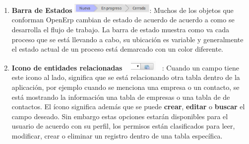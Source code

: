 \begin{enumerate}
 \item \textbf{Barra de Estados} \includegraphics[width=4cm,height=0.5cm]{./Imagenes/barraestados.png}:
  Muchos de los objetos que conforman OpenErp cambian de estado de acuerdo de acuerdo a como se desarrolla el
  flujo de trabajo. La barra de estado muestra como va cada proceso que se está llevando a cabo, su ubicación es variable
  y generalmente el estado actual de un proceso está demarcado con un color diferente.
 \item \textbf {Icono de entidades relacionadas} \includegraphics[width=2cm,height=0.5cm]{./Imagenes/entidadesrelacionadas.png}: Cuando un campo tiene este icono al lado,
 significa que se está relacionando otra tabla dentro de la aplicación, por ejemplo cuando se menciona una empresa o un contacto, se está mostrando la información una tabla
 de empresas o una tabla de de contactos. El ícono significa además que se puede  \textbf{crear}, \textbf{editar} o \textbf{buscar} el campo deseado. 
 Sin embargo estas opciones estarán disponibles para el usuario de acuerdo con su perfil, los permisos están clasificados para leer, modificar, crear
 o eliminar un registro dentro de una tabla específica. 
 
\end{enumerate}




